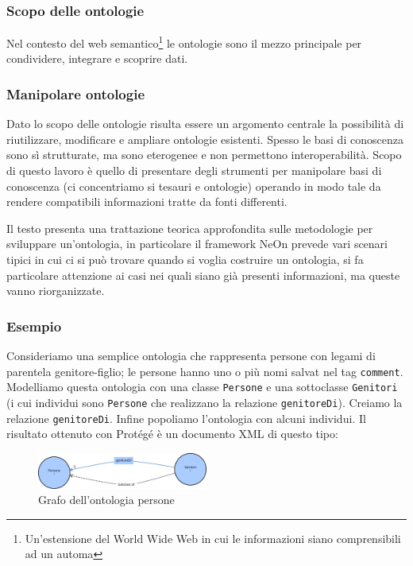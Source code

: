 \subsubsection{Scopo delle ontologie}
Nel contesto del web semantico\footnote{Un'estensione del World Wide Web in cui le informazioni siano comprensibili ad un automa\cite{berners2001new}} le ontologie sono il mezzo principale per condividere, integrare e scoprire dati\cite{hitzler2021review}.
\subsubsection{Manipolare ontologie}
 Dato lo scopo delle ontologie risulta essere un argomento centrale la possibilità di riutilizzare, modificare e ampliare ontologie esistenti. Spesso le basi di conoscenza sono sì strutturate, ma sono eterogenee e non permettono interoperabilità. Scopo di questo lavoro è quello di presentare degli strumenti per manipolare basi di conoscenza (ci concentriamo si tesauri e ontologie) operando in modo tale da rendere compatibili informazioni tratte da fonti differenti. 
 
 Il testo \cite{suarez2015neon} presenta una trattazione teorica approfondita sulle metodologie per sviluppare un'ontologia, in particolare il framework NeOn prevede vari scenari tipici in cui ci si può trovare quando si voglia costruire un ontologia, si fa particolare attenzione ai casi nei quali siano già presenti informazioni, ma queste vanno riorganizzate.
\subsubsection{Esempio}
Consideriamo una semplice ontologia che rappresenta persone con legami di parentela genitore-figlio; le persone hanno uno o più nomi salvat nel tag \verb|comment|. Modelliamo questa ontologia con una classe \verb|Persone| e una sottoclasse \verb|Genitori| (i cui individui sono \verb|Persone| che realizzano la relazione \verb|genitoreDi|). Creiamo la relazione \verb|genitoreDi|. Infine popoliamo l'ontologia con alcuni individui. Il risultato ottenuto con Protégé è un documento XML di questo tipo:
\begin{figure}
	\centering
	\includegraphics[width=0.5\textwidth]{Picture/persone.rdf.pdf}
	\caption{Grafo dell'ontologia persone}
\end{figure}

